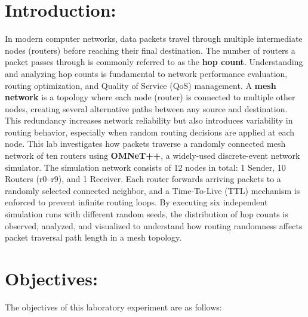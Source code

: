 \documentclass[12pt,a4paper]{article}
\begin{document}
\newpage

\tableofcontents
\newpage

\section{Introduction:}

\justifying
In modern computer networks, data packets travel through multiple intermediate nodes (routers) before reaching their final destination. The number of routers a packet passes through is commonly referred to as the \textbf{hop count}. Understanding and analyzing hop counts is fundamental to network performance evaluation, routing optimization, and Quality of Service (QoS) management. A \textbf{mesh network} is a topology where each node (router) is connected to multiple other nodes, creating several alternative paths between any source and destination. This redundancy increases network reliability but also introduces variability in routing behavior, especially when random routing decisions are applied at each node. This lab investigates how packets traverse a randomly connected mesh network of ten routers using \textbf{OMNeT++}, a widely-used discrete-event network simulator. The simulation network consists of 12 nodes in total: 1 Sender, 10 Routers (r0--r9), and 1 Receiver. Each router forwards arriving packets to a randomly selected connected neighbor, and a Time-To-Live (TTL) mechanism is enforced to prevent infinite routing loops. By executing six independent simulation runs with different random seeds, the distribution of hop counts is observed, analyzed, and visualized to understand how routing randomness affects packet traversal path length in a mesh topology.

\section{Objectives: }

\justifying
The objectives of this laboratory experiment are as follows:
\end{document}
